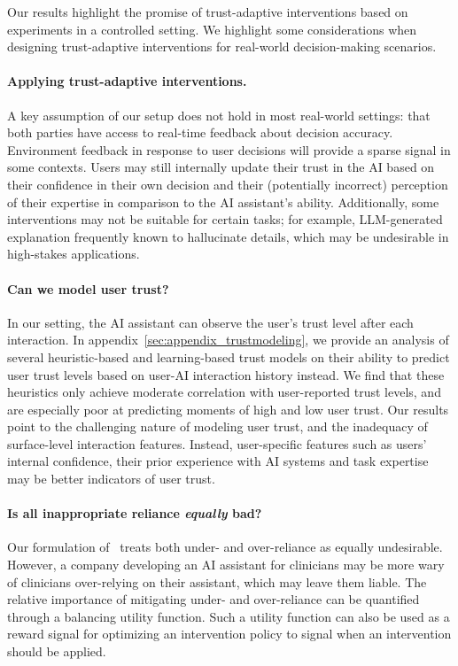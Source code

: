 Our results highlight the promise of trust-adaptive interventions based on experiments in a controlled setting. 
We highlight some considerations when designing trust-adaptive interventions for real-world decision-making scenarios.

\paragraph{Applying trust-adaptive interventions.} 
A key assumption of our setup does not hold in most real-world settings: that both parties have access to real-time feedback about decision accuracy. 
Environment feedback in response to user decisions will provide a sparse signal in some contexts. 
Users may still internally update their trust in the AI based on their confidence in their own decision and their (potentially incorrect) perception of their expertise in comparison to the AI assistant's ability.
Additionally, some interventions may not be suitable for certain tasks; for example, LLM-generated explanation frequently known to hallucinate details, which may be undesirable in high-stakes applications.

\paragraph{Can we model user trust?} 
In our setting, the AI assistant can observe the user's trust level after each interaction. 
In appendix~\ref{sec:appendix_trustmodeling}, we provide an analysis of several heuristic-based and learning-based trust models on their ability to predict user trust levels based on user-AI interaction history instead. 
We find that these heuristics only achieve moderate correlation with user-reported trust levels, and are especially poor at predicting moments of high and low user trust. 
Our results point to the challenging nature of modeling user trust, and the inadequacy of surface-level interaction features. 
Instead, user-specific features such as users' internal confidence, their prior experience with AI systems and task expertise may be better indicators of user trust.

\paragraph{Is all inappropriate reliance \emph{equally} bad?}
Our formulation of \totalinapprel\ treats both under- and over-reliance as equally undesirable.
However, a company developing an AI assistant for clinicians may be more wary of clinicians over-relying on their assistant, which may leave them liable. 
The relative importance of mitigating under- and over-reliance can be quantified through a balancing utility function.
Such a utility function can also be used as a reward signal for optimizing an intervention policy to signal when an intervention should be applied.
